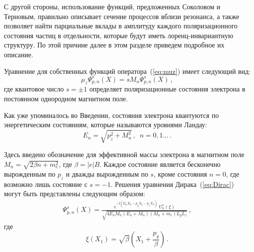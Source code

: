 С другой стороны, использование функций, предложенных Соколовом и Терновым, правильно описывает сечение процессов вблизи резонанса, а также позволяет найти парциальные вклады в амплитуду каждого поляризационного состояния частиц в отдельности, которые будут иметь лоренц-инвариантную структуру. По этой причине далее в этом разделе приведем подробное их описание. 

Уравнение для собственных функций оператора~(\ref{eq:muz}) имеет следующий вид:
\begin{equation}
	{\mu}_z \Psi^s_{p,n}(X)=s M_n \Psi^s_{p,n}(X)\, ,
\end{equation}
где квантовое число $s=\pm 1$ определяет поляризационные состояния электрона в постоянном однородном магнитном поле.

Как уже упоминалось во Введении, состояния электрона квантуются по энергетическим состояниям, которые называются уровнями Ландау:
\begin{equation}\label{eq:Energy_n}
	E_n = \sqrt{p_z^2+M_n^2}\, ,\,\,\, n=0,1\dots \, .
\end{equation}

Здесь введено обозначение для эффективной массы электрона в магнитном поле $M_n=\sqrt{2 \beta n + m_e^2}$, где $\beta=|e|B$. Каждое состояние является бесконечно вырожденным по $p_z$ и дважды вырожденным по $s$, кроме состояния $n=0$, где возможно лишь состояние с $s=-1$. Решения уравнения Дирака~(\ref{eq:Dirac}) могут быть представлены следующим образом:
\begin{eqnarray}
\label{eq:psie}
\Psi^s_{p,n}(X) = \frac{e^{-\ii(E_{n} X_0 - p_y X_2 - p_z X_3)}\; U^s_{n} (\xi)}
{\sqrt{4E_{n}M_n (E_{n} + M_n)(M_n + m_e) L_y L_z}} \, ,  
\end{eqnarray}
где 
\begin{equation}
	\xi(X_1)=\sqrt{\beta}\left(X_1+ \frac{p_y}{\beta}\right)\, .
\end{equation}

